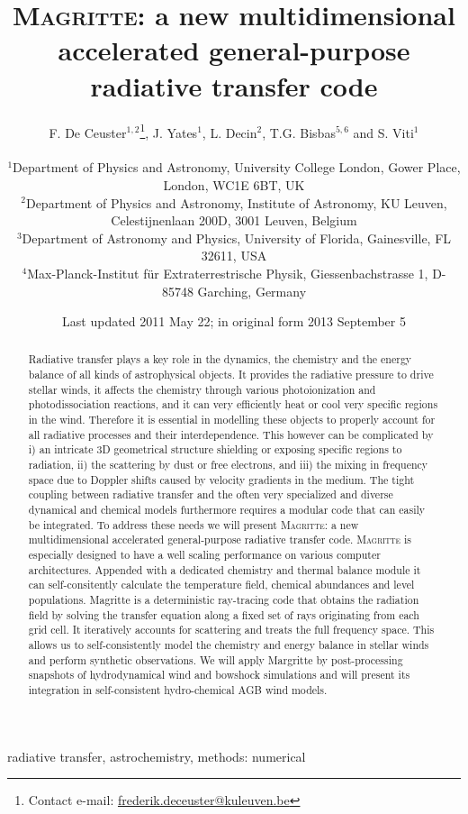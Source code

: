 \documentclass[a4paper,fleqn,usenatbib]{mnras}
\title[Magritte]{\textbf{\textsc{Magritte}}: a new multidimensional accelerated general-purpose radiative transfer code}
\author[F. De Ceuster et al.]{
F. De Ceuster$^{1,2}$\thanks{Contact e-mail: \href{frederik.deceuster@kuleuven.be}{frederik.deceuster@kuleuven.be}},
J. Yates$^{1}$,
L. Decin$^{2}$,
T.G. Bisbas$^{5,6}$ and
S. Viti$^{1}$
\\ \\
$^{1}$Department of Physics and Astronomy, University College London, Gower Place, London, WC1E 6BT, UK \\
$^{2}$Department of Physics and Astronomy, Institute of Astronomy, KU Leuven, Celestijnenlaan 200D, 3001 Leuven, Belgium \\
$^{3}$Department of Astronomy and Physics, University of Florida, Gainesville, FL 32611, USA \\
$^{4}$Max-Planck-Institut f\"ur Extraterrestrische Physik, Giessenbachstrasse 1, D-85748 Garching, Germany}
\date{Last updated 2011 May 22; in original form 2013 September 5}
\begin{document}
\label{firstpage}
\pagerange{\pageref{firstpage}--\pageref{lastpage}}
\maketitle

\begin{abstract}
	Radiative transfer plays a key role in the dynamics, the chemistry and the energy balance of all kinds of astrophysical objects. It provides the radiative pressure to drive stellar winds, it affects the chemistry through various photoionization and photodissociation reactions, and it can very efficiently heat or cool very specific regions in the wind. Therefore it is essential in modelling these objects to properly account for all radiative processes and their interdependence. This however can be complicated by i) an intricate 3D geometrical structure shielding or exposing specific regions to radiation, ii) the scattering by dust or free electrons, and iii) the mixing in frequency space due to Doppler shifts caused by velocity gradients in the medium. The tight coupling between radiative transfer and the often very specialized and diverse dynamical and chemical models furthermore requires a modular code that can easily be integrated. To address these needs we will present \textsc{Magritte}: a new multidimensional accelerated general-purpose radiative transfer code. \textsc{Magritte} is especially designed to have a well scaling performance on various computer architectures.  Appended with a dedicated chemistry and thermal balance module it can self-consitently calculate the temperature field, chemical abundances and level populations. Magritte is a deterministic ray-tracing code that obtains the radiation field by solving the transfer equation along a fixed set of rays originating from each grid cell. It iteratively accounts for scattering and treats the full frequency space. This allows us to self-consistently model the chemistry and energy balance in stellar winds and perform synthetic observations. We will apply {\sc Margritte} by post-processing snapshots of hydrodynamical wind and bowshock simulations and will present its integration in self-consistent hydro-chemical AGB wind models.
\end{abstract}

\begin{keywords}
radiative transfer, astrochemistry, methods: numerical
\end{keywords}
\end{document}
